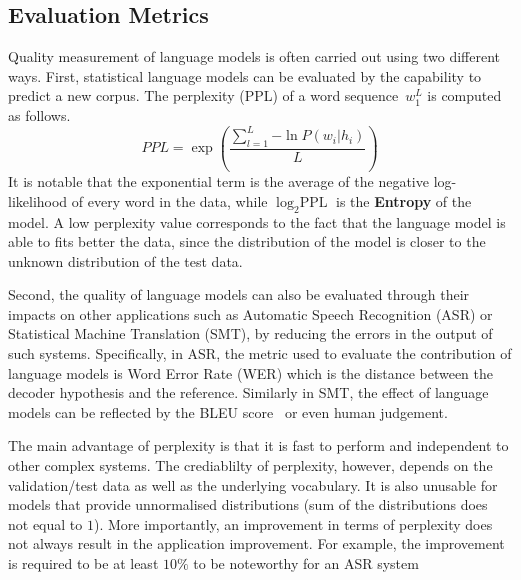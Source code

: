\subsection{Evaluation Metrics}

Quality measurement of language models is often carried out using two different ways. First, statistical language models can be evaluated by the capability to predict a new corpus. The perplexity (PPL) of a word sequence~\textbf{$w_1^L$} is computed as follows.
\begin{equation}
\label{eq:ppl}
PPL = \exp(\frac{\sum_{l=1}^L{-\ln P(w_i|h_i)}}{L}  )
\end{equation}
It is notable that the exponential term is the average of the negative log-likelihood of every word in the data, while $\log_2 \text{PPL}$ is the \textbf{Entropy} of the model. A low perplexity value corresponds to the fact that the language model is able to fits better the data, since the distribution of the model is closer to the unknown distribution of the test data. 

Second, the quality of language models can also be evaluated through their impacts on other applications such as Automatic Speech Recognition (ASR) or Statistical Machine Translation (SMT), by reducing the errors in the output of such systems. Specifically, in ASR, the metric used to evaluate the contribution of language models is Word Error Rate (WER) which is the distance between the decoder hypothesis and the reference. Similarly in SMT, the effect of language models can be reflected by the BLEU score~\cite{papineni2002bleu} or even human judgement. 

The main advantage of perplexity is that it is fast to perform and independent to other complex systems. The crediablilty of perplexity, however, depends on the validation/test data as well as the underlying vocabulary. It is also unusable for models that provide unnormalised distributions (sum of the distributions does not equal to $1$). More importantly, an improvement in terms of perplexity does not always result in the application improvement. For example, the improvement is required to be at least $10\%$ to be noteworthy for an ASR system~\cite{Rosenfeld:2000}


